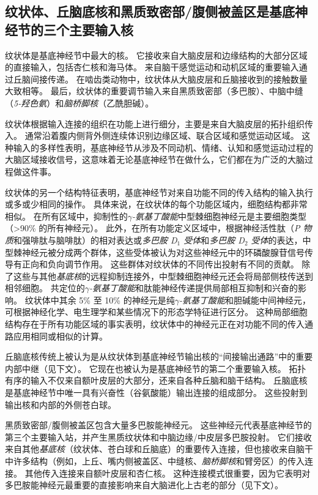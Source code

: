 \subsection{纹状体、丘脑底核和黑质致密部/腹侧被盖区是基底神经节的三个主要输入核}

纹状体是基底神经节中最大的核。
它接收来自大脑皮层和边缘结构的大部分区域的直接输入，包括杏仁核和海马体。
来自脑干感觉运动和动机区域的重要输入通过丘脑间接传递。
在啮齿类动物中，纹状体从大脑皮层和丘脑接收到的接触数量大致相等。
最后，纹状体的重要调节输入来自黑质致密部（多巴胺）、中脑中缝（\textit{5-羟色氨}）和\textit{脑桥脚核}（乙酰胆碱）。


纹状体根据输入连接的组织在功能上进行细分，主要是来自大脑皮层的拓扑组织传入。
通常沿着腹内侧背外侧连续体识别边缘区域、联合区域和感觉运动区域。
这种输入的多样性表明，基底神经节从涉及不同动机、情绪、认知和感觉运动过程的大脑区域接收信号，这意味着无论基底神经节在做什么，它们都在为广泛的大脑过程做这件事。


纹状体的另一个结构特征表明，基底神经节对来自功能不同的传入结构的输入执行或多或少相同的操作。
具体来说，在纹状体的每个功能区域内，细胞结构都非常相似。
在所有区域中，抑制性的\textit{$\gamma$-氨基丁酸能}中型棘细胞神经元是主要细胞类型（>90\% 的所有神经元）。
此外，在所有功能定义区域中，根据神经活性肽（\textit{P 物质}和强啡肽与脑啡肽）的相对表达或\textit{多巴胺 D$_1$ 受体}和\textit{多巴胺 D$_2$ 受体}的表达，中型棘神经元被分成两个群体，这些受体被认为对这些神经元中的环磷酸腺苷信号传导有正向和负向调节作用。
这些群体对纹状体的不同传出投射有不同的贡献。
除了这些与其他\textit{基底核}的远程抑制连接外，中型棘细胞神经元还会将局部侧枝传送到相邻细胞。
共定位的\textit{$\gamma$-氨基丁酸能}和肽能神经传递提供局部相互抑制和兴奋的影响。
纹状体中其余 5\% 至 10\% 的神经元是纯\textit{$\gamma$-氨基丁酸能}和胆碱能中间神经元，可根据神经化学、电生理学和某些情况下的形态学特征进行区分。
这种局部细胞结构存在于所有功能区域的事实表明，纹状体中的神经元正在对功能不同的传入通路应用相同或相似的计算。


丘脑底核传统上被认为是从纹状体到基底神经节输出核的“间接输出通路”中的重要内部中继（见下文）。
它现在也被认为是基底神经节的第二个重要输入核。
拓扑有序的输入不仅来自额叶皮层的大部分，还来自各种丘脑和脑干结构。
丘脑底核是基底神经节中唯一具有兴奋性（谷氨酸能）输出连接的组成部分。
这些投射到输出核和内部的外侧苍白球。


黑质致密部/腹侧被盖区包含大量多巴胺能神经元。
这些神经元代表基底神经节的第三个主要输入站，并产生黑质纹状体和中脑边缘/中皮层多巴胺投射。
它们接收来自其他\textit{基底核}（纹状体、苍白球和丘脑底）的重要传入连接，但也接收来自脑干中许多结构（例如，上丘、嘴内侧被盖区、中缝核、\textit{脑桥脚核}和臂旁区）的传入连接。
其他传入连接来自额叶皮层和杏仁核。
这种连接模式很重要，因为它表明对多巴胺能神经元最重要的直接影响来自大脑进化上古老的部分（见下文）。


